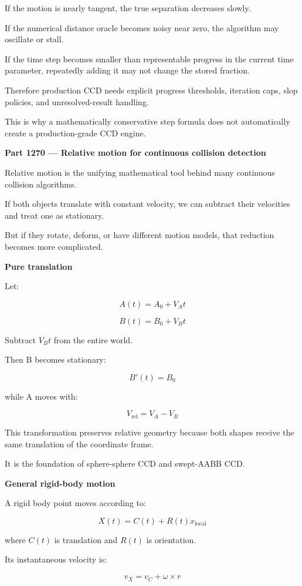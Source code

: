 If the motion is nearly tangent, the true separation decreases slowly.

If the numerical distance oracle becomes noisy near zero, the algorithm may oscillate or stall.

If the time step becomes smaller than representable progress in the current time parameter, repeatedly adding it may not change the stored fraction.

Therefore production CCD needs explicit progress thresholds, iteration caps, slop policies, and unresolved-result handling.

This is why a mathematically conservative step formula does not automatically create a production-grade CCD engine.

\textbf{Part 1270 --- Relative motion for continuous collision detection}

Relative motion is the unifying mathematical tool behind many continuous collision algorithms.

If both objects translate with constant velocity, we can subtract their velocities and treat one as stationary.

But if they rotate, deform, or have different motion models, that reduction becomes more complicated.

\textbf{Pure translation}

Let:

\[
A(t)=A_0+V_At
\]

\[
B(t)=B_0+V_Bt
\]

Subtract \(V_Bt\) from the entire world.

Then B becomes stationary:

\[
B'(t)=B_0
\]

while A moves with:

\[
\boxed{ V_{\mathrm{rel}}=V_A-V_B }
\]

This transformation preserves relative geometry because both shapes receive the same translation of the coordinate frame.

It is the foundation of sphere-sphere CCD and swept-AABB CCD.

\textbf{General rigid-body motion}

A rigid body point moves according to:

\[
\boxed{ X(t)=C(t)+R(t)x_{\mathrm{local}} }
\]

where \(C(t)\) is translation and \(R(t)\) is orientation.

Its instantaneous velocity is:

\[
\boxed{ v_X=v_C+\omega\times r }
\]

